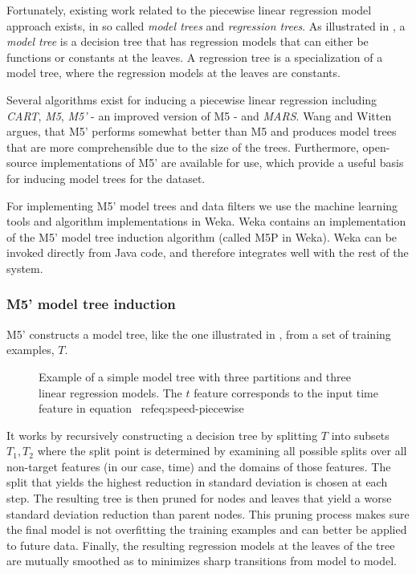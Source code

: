 Fortunately, existing work related to the piecewise linear regression model approach exists, in so called \emph{model trees} and \emph{regression trees}. As illustrated in , a \emph{model tree} is a decision tree that has regression models that can either be functions or constants at the leaves. A regression tree is a specialization of a model tree, where the regression models at the leaves are constants.

Several algorithms exist for inducing a piecewise linear regression including \emph{CART}\cite{CART}, \emph{M5}\cite{M5}, \emph{M5'}\cite{IMTCC96} - an improved version of M5 - and \emph{MARS}\cite{MARS}. Wang and Witten\cite{IMTCC96} argues, that M5' performs somewhat better than M5 and produces model trees that are more comprehensible due to the size of the trees. Furthermore, open-source implementations of M5' are available for use, which provide a useful basis for inducing model trees for the dataset.

For implementing M5' model trees and data filters we use the machine learning tools and algorithm implementations in Weka\cite{Weka}. Weka contains an implementation of the M5' model tree induction algorithm (called M5P in Weka). Weka can be invoked directly from Java code, and therefore integrates well with the rest of the system.

\subsubsection{M5' model tree induction}
M5' constructs a model tree, like the one illustrated in , from a set of training examples, $T$.
\begin{figure}[H]
	\centering
	\caption{Example of a simple model tree with three partitions and three linear regression models. The $t$ feature corresponds to the input time feature in equation \
	ref{eq:speed-piecewise}}
	\label{fig:model-tree}
\end{figure}
It works by recursively constructing a decision tree by splitting $T$ into subsets $T_1,T_2$ where the split point is determined by examining all possible splits over all non-target features (in our case, time) and the domains of those features. The split that yields the highest reduction in standard deviation is chosen at each step.
The resulting tree is then pruned for nodes and leaves that yield a worse standard deviation reduction than parent nodes. This pruning process makes sure the final model is not overfitting the training examples and can better be applied to future data.
Finally, the resulting regression models at the leaves of the tree are mutually smoothed as to minimizes sharp transitions from model to model.

